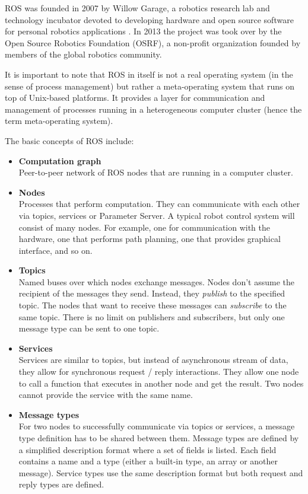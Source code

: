 \documentclass[english,inz,shortabstract]{iithesis}
\begin{document}
    ROS was founded in 2007 by Willow Garage, a robotics research lab and technology incubator devoted to developing hardware and open source software for personal robotics applications \cite{ros:willowgarage}. In 2013 the project was took over by the Open Source Robotics Foundation (OSRF), a non-profit organization founded by members of the global robotics community.

    It is important to note that ROS in itself is not a real operating system (in the sense of process management) but rather a meta-operating system that runs on top of Unix-based platforms. It provides a layer for communication and management of processes running in a heterogeneous computer cluster (hence the term meta-operating system).

    The basic concepts of ROS include:
    \begin{itemize}
        \item \textbf{Computation graph}\\
        Peer-to-peer network of ROS nodes that are running in a computer cluster.
        \item \textbf{Nodes}\\
        Processes that perform computation. They can communicate with each other via topics, services or Parameter Server. A typical robot control system will consist of many nodes. For example, one for communication with the hardware, one that performs path planning, one that provides graphical interface, and so on.
        \item \textbf{Topics}\\
        Named buses over which nodes exchange messages. Nodes don't assume the recipient of the messages they send. Instead, they \textit{publish} to the specified topic. The nodes that want to receive these messages can \textit{subscribe} to the same topic. There is no limit on publishers and subscribers, but only one message type can be sent to one topic.
        \item \textbf{Services}\\
        Services are similar to topics, but instead of asynchronous stream of data, they allow for synchronous request / reply interactions. They allow one node to call a function that executes in another node and get the result. Two nodes cannot provide the service with the same name.
        \item \textbf{Message types}\\
        For two nodes to successfully communicate via topics or services, a message type definition has to be shared between them. Message types are defined by a simplified description format where a set of fields is listed. Each field contains a name and a type (either a built-in type, an array or another message). Service types use the same description format but both request and reply types are defined.

\end{itemize}
\end{document}
